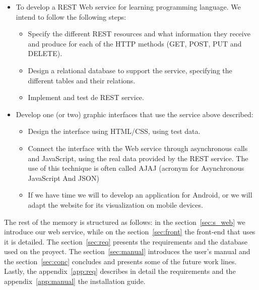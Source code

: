 \begin{itemize}
\item
To develop a REST Web service for learning programming language. We intend to follow the following steps:

\begin{itemize}
\item
Specify the different REST resources and what information they receive and produce for each of the HTTP methods (GET, POST, PUT and DELETE).

\item
Design a relational database to support the service, specifying the different tables and their relations.

\item
Implement and test de REST service.

\end{itemize}

\item
Develop one (or two) graphic interfaces that use the service above described:

\begin{itemize}
\item
Design the interface using HTML/CSS, using test data.

\item
Connect the interface with the Web service through asynchronous calls and JavaScript, using the real data provided by the REST service. The use of this technique is often called AJAJ (acronym for Asynchronous JavaScript And JSON)

\item
If we have time we will to develop an application for Android, or we will adapt the website for its visualization on mobile devices.

\end{itemize}

\end{itemize}

The rest of the memory is structured as follows: in the section~\ref{sec:s_web} we introduce our web service, while on the section~\ref{sec:front} the front-end that uses it is detailed.
The section~\ref{sec:req} presents the requirements and the database used on the proyect. The section~\ref{sec:manual} introduces the user's manual and the section~\ref{sec:conc} concludes and presents some of the future work lines.
Lastly, the appendix~\ref{app:req} describes in detail the requirements and the appendix~\ref{app:manual} the installation guide.